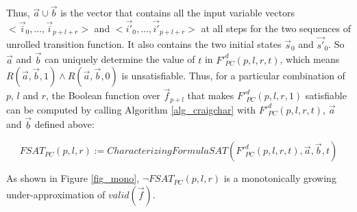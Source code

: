 \documentclass[runningheads,a4paper,orivec]{llncs}
\begin{document}
Thus,
$\vec{a}\cup\vec{b}$ is the vector that contains all the input variable vectors $<\vec{i}_0,\dots,\vec{i}_{p+l+r}>$ and $<\vec{i'}_0,\dots,\vec{i'}_{p+l+r}>$
at all steps for the two sequences of unrolled transition function.
It also contains the two initial states $\vec{s}_0$ and $\vec{s'}_0$.
So $\vec{a}$ and $\vec{b}$ can uniquely determine the value of $t$ in $F'^d_{PC}(p,l,r,t)$,
which means $R(\vec{a},\vec{b},1)\wedge R(\vec{a},\vec{b},0)$ is unsatisfiable.
Thus,
for a particular combination of $p$, $l$ and $r$,
the Boolean function over $\vec{f}_{p+l}$ that makes $F'^d_{PC}(p,l,r,1)$ satisfiable can be computed 
by calling Algorithm \ref{alg_craigchar} with $F'^d_{PC}(p,l,r,t)$, $\vec{a}$ and $\vec{b}$ defined above:

\begin{equation}\label{fsat_pc}
FSAT_{PC}(p,l,r):=CharacterizingFormulaSAT(F'^d_{PC}(p,l,r,t),\vec{a},\vec{b},t)
\end{equation}

% 
As shown in Figure \ref{fig_mono},
$\neg FSAT_{PC}(p,l,r)$ is a monotonically growing under-approximation of $valid(\vec{f})$.
\end{document}
